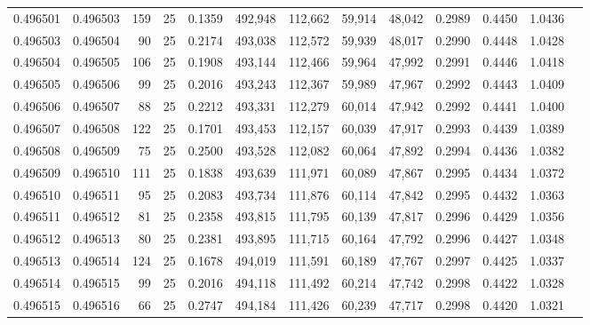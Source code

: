 \begin{tabular}{rrrrrrrrrrrrr}
0.496501 & 0.496503 &   159 &  25 &                                     0.1359 & 492,948 & 112,662 &  59,914 &  48,042 & 0.2989 & 0.4450 & 1.0436 \\
0.496503 & 0.496504 &    90 &  25 &                                     0.2174 & 493,038 & 112,572 &  59,939 &  48,017 & 0.2990 & 0.4448 & 1.0428 \\
0.496504 & 0.496505 &   106 &  25 &                                     0.1908 & 493,144 & 112,466 &  59,964 &  47,992 & 0.2991 & 0.4446 & 1.0418 \\
0.496505 & 0.496506 &    99 &  25 &                                     0.2016 & 493,243 & 112,367 &  59,989 &  47,967 & 0.2992 & 0.4443 & 1.0409 \\
0.496506 & 0.496507 &    88 &  25 &                                     0.2212 & 493,331 & 112,279 &  60,014 &  47,942 & 0.2992 & 0.4441 & 1.0400 \\
0.496507 & 0.496508 &   122 &  25 &                                     0.1701 & 493,453 & 112,157 &  60,039 &  47,917 & 0.2993 & 0.4439 & 1.0389 \\
0.496508 & 0.496509 &    75 &  25 &                                     0.2500 & 493,528 & 112,082 &  60,064 &  47,892 & 0.2994 & 0.4436 & 1.0382 \\
0.496509 & 0.496510 &   111 &  25 &                                     0.1838 & 493,639 & 111,971 &  60,089 &  47,867 & 0.2995 & 0.4434 & 1.0372 \\
0.496510 & 0.496511 &    95 &  25 &                                     0.2083 & 493,734 & 111,876 &  60,114 &  47,842 & 0.2995 & 0.4432 & 1.0363 \\
0.496511 & 0.496512 &    81 &  25 &                                     0.2358 & 493,815 & 111,795 &  60,139 &  47,817 & 0.2996 & 0.4429 & 1.0356 \\
0.496512 & 0.496513 &    80 &  25 &                                     0.2381 & 493,895 & 111,715 &  60,164 &  47,792 & 0.2996 & 0.4427 & 1.0348 \\
0.496513 & 0.496514 &   124 &  25 &                                     0.1678 & 494,019 & 111,591 &  60,189 &  47,767 & 0.2997 & 0.4425 & 1.0337 \\
0.496514 & 0.496515 &    99 &  25 &                                     0.2016 & 494,118 & 111,492 &  60,214 &  47,742 & 0.2998 & 0.4422 & 1.0328 \\
0.496515 & 0.496516 &    66 &  25 &                                     0.2747 & 494,184 & 111,426 &  60,239 &  47,717 & 0.2998 & 0.4420 & 1.0321 \\

\end{tabular}
